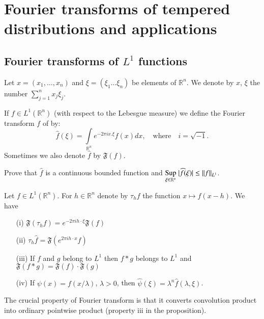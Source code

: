 \chapter{Fourier transforms of tempered distributions and
  applications}\label{chap4}

\setcounter{pageoriginal}{0}
\section*{Fourier transforms of $L^{1}$ functions}\pageoriginale

Let $x=(x_{1},\ldots,x_{n})$ and $\xi=(\xi_{1}\ldots\xi_{n})$ be
elements of $\mathbb{R}^{n}$. We denote by $x$, $\xi$ the number
$\sum\limits^{n}_{j=1}x_{j}\xi_{j}$. 

If $f\in L^{1}(\mathbb{R}^{n})$ (with respect to the Lebesgue measure)
we define the Fourier transform $f$ of by:
$$
\widehat{f}(\xi)=\int\limits_{\mathbb{R}^{n}}e^{-2\pi
  ix.\xi}f(x)dx,\quad\text{where}\quad i=\sqrt{-1}.
$$
Sometimes we also denote $\widehat{f}$ by $\mathfrak{F}(f)$.

\begin{exer*}
Prove that $\widehat{f}$ is a continuous bounded function and
$\displaystyle{\mathop{\operatorname{Sup}}\limits_{\xi\in \mathbb{R}^{n}}}\;|\widehat{f}(\xi)|\leq ||f||_{L^{1}}$.
\end{exer*}

\setcounter{proposition}{0}
\begin{proposition}\label{chap4-prop1}
Let $f\in L^{1}(\mathbb{R}^{n})$. For $h\in \mathbb{R}^{n}$ denote by
$\tau_{h}f$ the function $x\mapsto f(x-h)$. We have
\begin{itemize}
\item[\rm(i)] $\mathfrak{F}(\tau_{h}f)=e^{-2\pi ih\cdot
  \xi}\mathfrak{F}(f)$

\item[\rm(ii)] $\tau_{h}\widehat{f}=\mathfrak{F}(e^{2\pi ih\cdot x}f)$

\item[\rm(iii)] If $f$ and $g$ belong to $L^{1}$ then $f\ast g$
  belongs to $L^{1}$ and $\mathfrak{F}(f\ast g)=\mathfrak{F}(f)\cdot
  \mathfrak{F}(g)$

\item[\rm(iv)] If $\psi(x)=f(x/\lambda)$, $\lambda >0$, then $\widehat{\psi}(\xi)=\lambda^{n}\widehat{f}(\lambda,\xi)$.
\end{itemize}
\end{proposition}

\begin{remark*}
The crucial property of Fourier transform is that it converts
convolution product into ordinary pointwise product (property iii in
the proposition).
\end{remark*}

